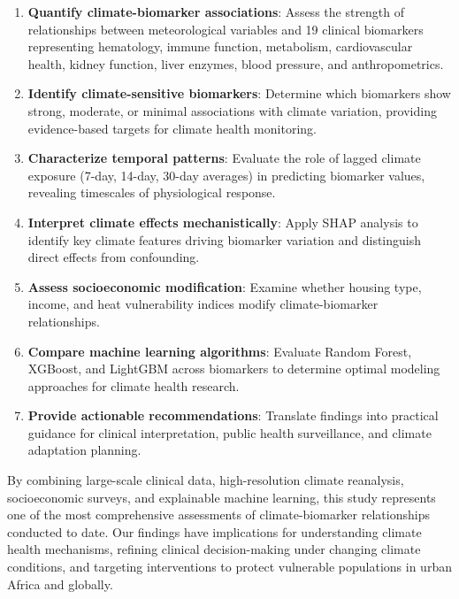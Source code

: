 \begin{enumerate}
    \item \textbf{Quantify climate-biomarker associations}: Assess the strength of relationships between meteorological variables and 19 clinical biomarkers representing hematology, immune function, metabolism, cardiovascular health, kidney function, liver enzymes, blood pressure, and anthropometrics.

    \item \textbf{Identify climate-sensitive biomarkers}: Determine which biomarkers show strong, moderate, or minimal associations with climate variation, providing evidence-based targets for climate health monitoring.

    \item \textbf{Characterize temporal patterns}: Evaluate the role of lagged climate exposure (7-day, 14-day, 30-day averages) in predicting biomarker values, revealing timescales of physiological response.

    \item \textbf{Interpret climate effects mechanistically}: Apply SHAP analysis to identify key climate features driving biomarker variation and distinguish direct effects from confounding.

    \item \textbf{Assess socioeconomic modification}: Examine whether housing type, income, and heat vulnerability indices modify climate-biomarker relationships.

    \item \textbf{Compare machine learning algorithms}: Evaluate Random Forest, XGBoost, and LightGBM across biomarkers to determine optimal modeling approaches for climate health research.

    \item \textbf{Provide actionable recommendations}: Translate findings into practical guidance for clinical interpretation, public health surveillance, and climate adaptation planning.
\end{enumerate}

By combining large-scale clinical data, high-resolution climate reanalysis, socioeconomic surveys, and explainable machine learning, this study represents one of the most comprehensive assessments of climate-biomarker relationships conducted to date. Our findings have implications for understanding climate health mechanisms, refining clinical decision-making under changing climate conditions, and targeting interventions to protect vulnerable populations in urban Africa and globally.
